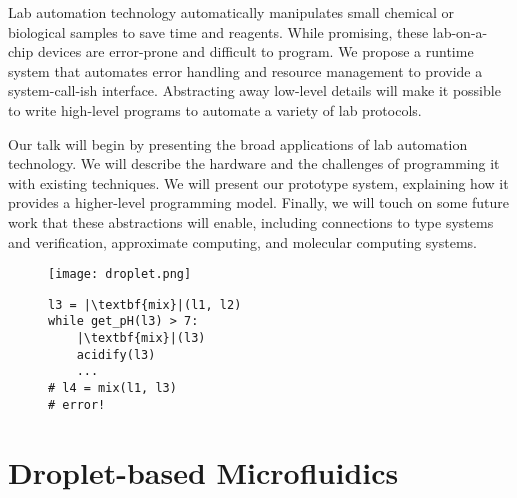 \documentclass[
  10pt,
  a4paper,
  twocolumn,
]{article}
\title{\mytitle}
\author{\myauthors
\\ \small Paul G. Allen School for Computer Science and Engineering
\\ \small University of Washington}
\date{}
\begin{document}
\maketitle

Lab automation technology automatically manipulates small chemical or biological samples to save time and reagents.
While promising, these lab-on-a-chip devices are error-prone and difficult to program.
We propose a runtime system that automates error handling and resource management to provide a system-call-ish interface.
Abstracting away low-level details will make it possible to write high-level programs to automate a variety of lab protocols.

Our talk will begin by presenting the broad applications of lab automation technology.
We will describe the hardware and the challenges of programming it with existing techniques.
We will present our prototype system, explaining how it provides a higher-level programming model.
Finally, we will touch on some future work that these abstractions will enable, including connections to type systems and verification, approximate computing, and molecular computing systems.

\begin{figure}[h]
  \begin{minipage}{0.4\linewidth}
    \footnotesize
    \centering
    \texttt{[image: droplet.png]}
  \end{minipage}
  \hfill
  \begin{minipage}{0.53\linewidth}
    \begin{verbatim}
l3 = |\textbf{mix}|(l1, l2)
while get_pH(l3) > 7:
    |\textbf{mix}|(l3)
    acidify(l3)
    ...
# l4 = mix(l1, l3)
# error!
    \end{verbatim}
  \end{minipage}
  \label{fig:board}
  \vspace{-1em}
  \label{fig:code}
  \vspace{-2em}
\end{figure}

\section*{Droplet-based Microfluidics}
\end{document}
